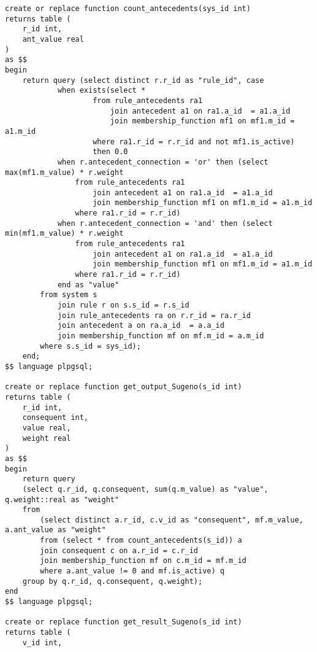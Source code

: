\begin{lstlisting}[caption=Реализация получения результата работы нечетких экспертных систем (часть 1), label={lst:output}]
create or replace function count_antecedents(sys_id int)
returns table (
	r_id int,
	ant_value real
)
as $$
begin
	return query (select distinct r.r_id as "rule_id", case 
			when exists(select * 
					from rule_antecedents ra1
						join antecedent a1 on ra1.a_id  = a1.a_id 
						join membership_function mf1 on mf1.m_id = a1.m_id
					where ra1.r_id = r.r_id and not mf1.is_active)
					then 0.0
			when r.antecedent_connection = 'or' then (select max(mf1.m_value) * r.weight
				from rule_antecedents ra1
					join antecedent a1 on ra1.a_id  = a1.a_id 
					join membership_function mf1 on mf1.m_id = a1.m_id
				where ra1.r_id = r.r_id) 
			when r.antecedent_connection = 'and' then (select min(mf1.m_value) * r.weight
				from rule_antecedents ra1
					join antecedent a1 on ra1.a_id  = a1.a_id 
					join membership_function mf1 on mf1.m_id = a1.m_id 
				where ra1.r_id = r.r_id)
			end as "value"
		from system s 
			join rule r on s.s_id = r.s_id 
			join rule_antecedents ra on r.r_id = ra.r_id 
			join antecedent a on ra.a_id  = a.a_id 
			join membership_function mf on mf.m_id = a.m_id
		where s.s_id = sys_id);
	end;
$$ language plpgsql;

create or replace function get_output_Sugeno(s_id int)
returns table (
	r_id int,
	consequent int,
	value real,
	weight real
)
as $$
begin
	return query 
	(select q.r_id, q.consequent, sum(q.m_value) as "value", q.weight::real as "weight"
	from 
		(select distinct a.r_id, c.v_id as "consequent", mf.m_value, a.ant_value as "weight"
		from (select * from count_antecedents(s_id)) a
		join consequent c on a.r_id = c.r_id
		join membership_function mf on c.m_id = mf.m_id  
		where a.ant_value != 0 and mf.is_active) q
	group by q.r_id, q.consequent, q.weight);
end
$$ language plpgsql;

create or replace function get_result_Sugeno(s_id int)
returns table (
	v_id int,
\end{lstlisting}
